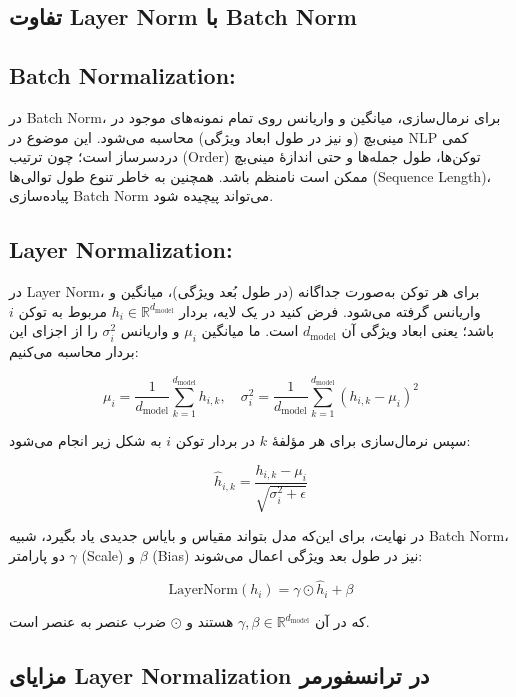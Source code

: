 \subsection*{تفاوت Layer Norm با Batch Norm}

\subsection*{Batch Normalization:}

در Batch Norm، برای نرمال‌سازی، میانگین و واریانس روی تمام نمونه‌های موجود در مینی‌بچ (و نیز در طول ابعاد ویژگی) محاسبه می‌شود.
این موضوع در NLP کمی دردسرساز است؛ چون ترتیب (Order) توکن‌ها، طول جمله‌ها و حتی اندازهٔ مینی‌بچ ممکن است نامنظم باشد.
همچنین به خاطر تنوع طول توالی‌ها (Sequence Length)، پیاده‌سازی Batch Norm می‌تواند پیچیده شود.

\subsection*{Layer Normalization:}

در Layer Norm، برای هر توکن به‌صورت جداگانه (در طول بُعد ویژگی)، میانگین و واریانس گرفته می‌شود.
فرض کنید در یک لایه، بردار \( h_i \in \mathbb{R}^{d_{\text{model}}} \) مربوط به توکن \( i \) باشد؛ یعنی ابعاد ویژگی آن \( d_{\text{model}} \) است. ما میانگین \( \mu_i \) و واریانس \( \sigma_i^2 \) را از اجزای این بردار محاسبه می‌کنیم:

\[
\mu_i = \frac{1}{d_{\text{model}}} \sum_{k=1}^{d_{\text{model}}} h_{i,k}, \quad
\sigma_i^2 = \frac{1}{d_{\text{model}}} \sum_{k=1}^{d_{\text{model}}} (h_{i,k} - \mu_i)^2
\]

سپس نرمال‌سازی برای هر مؤلفهٔ \( k \) در بردار توکن \( i \) به شکل زیر انجام می‌شود:

\[
\hat{h}_{i,k} = \frac{h_{i,k} - \mu_i}{\sqrt{\sigma_i^2 + \epsilon}}
\]

در نهایت، برای این‌که مدل بتواند مقیاس و بایاس جدیدی یاد بگیرد، شبیه Batch Norm، دو پارامتر \( \gamma \) (Scale) و \( \beta \) (Bias) نیز در طول بعد ویژگی اعمال می‌شوند:

\[
\text{LayerNorm}(h_i) = \gamma \odot \hat{h}_i + \beta
\]

که در آن \( \gamma, \beta \in \mathbb{R}^{d_{\text{model}}} \) هستند و \( \odot \) ضرب عنصر به عنصر است.

\subsection*{مزایای Layer Normalization در ترانسفورمر}

